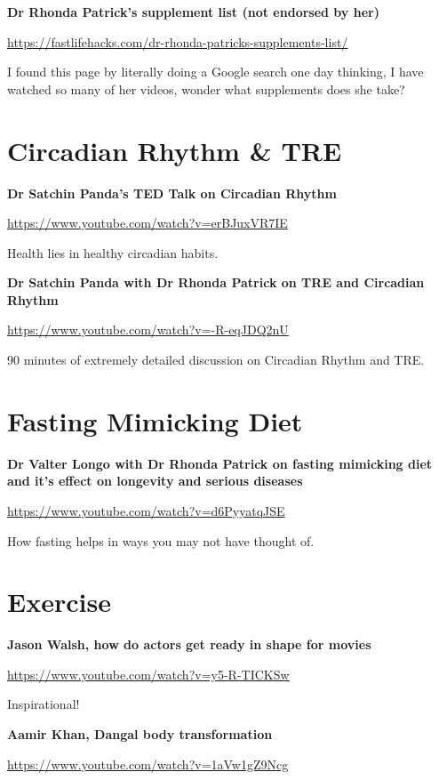 \documentclass[
  oneside]{book}
\begin{document}
\textbf{Dr Rhonda Patrick's supplement list (not endorsed by her)}

\url{https://fastlifehacks.com/dr-rhonda-patricks-supplements-list/}

I found this page by literally doing a Google search one day thinking, I have watched so many of her videos, wonder what supplements does she take?

\hypertarget{circadian-rhythm-tre}{%
\section{Circadian Rhythm \& TRE}\label{circadian-rhythm-tre}}

\textbf{Dr Satchin Panda's TED Talk on Circadian Rhythm}

\url{https://www.youtube.com/watch?v=erBJuxVR7IE}

Health lies in healthy circadian habits.

\textbf{Dr Satchin Panda with Dr Rhonda Patrick on TRE and Circadian Rhythm}

\url{https://www.youtube.com/watch?v=-R-eqJDQ2nU}

90 minutes of extremely detailed discussion on Circadian Rhythm and TRE.

\hypertarget{fasting-mimicking-diet}{%
\section{Fasting Mimicking Diet}\label{fasting-mimicking-diet}}

\textbf{Dr Valter Longo with Dr Rhonda Patrick on fasting mimicking diet and it's effect on longevity and serious diseases}

\url{https://www.youtube.com/watch?v=d6PyyatqJSE}

How fasting helps in ways you may not have thought of.

\hypertarget{exercise}{%
\section{Exercise}\label{exercise}}

\textbf{Jason Walsh, how do actors get ready in shape for movies}

\url{https://www.youtube.com/watch?v=y5-R-TICKSw}

Inspirational!

\textbf{Aamir Khan, Dangal body transformation}

\url{https://www.youtube.com/watch?v=1aVw1gZ9Ncg}
\end{document}
